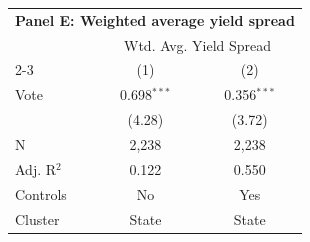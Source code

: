 \begingroup
\centering
\begin{tabular*}{\textwidth}{@{\extracolsep{\fill}}lcc}
\multicolumn{3}{l}{\textbf{Panel E: Weighted average yield spread}}\\
\addlinespace
   \toprule
    & \multicolumn{2}{c}{Wtd. Avg. Yield Spread}\\
   \cmidrule(lr){2-3}
                  & (1)           & (2)\\
   \midrule
   Vote           & 0.698$^{***}$ & 0.356$^{***}$\\
                  & (4.28)       & (3.72)\\
   \hline
   N   & 2,238         & 2,238\\
   Adj. R$^2$ & 0.122         & 0.550\\
   Controls                   & No & Yes\\
   Cluster              & State & State\\
   \bottomrule
\end{tabular*}
\par\endgroup
